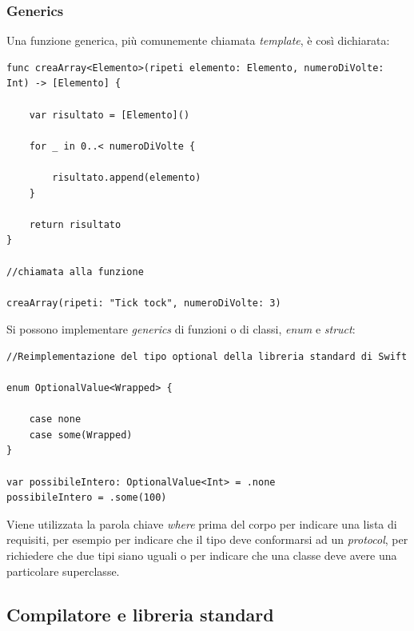 \subsubsection{Generics}
Una funzione generica, più comunemente chiamata \textit{template}, è così dichiarata:
\lstset{language=[Objective]C, breakindent=40pt, breaklines} 
\begin{lstlisting}
func creaArray<Elemento>(ripeti	elemento: Elemento, numeroDiVolte: Int) -> [Elemento] {

	var risultato = [Elemento]()
	
	for _ in 0..< numeroDiVolte {
		
		risultato.append(elemento)
	}
	
	return risultato
}

//chiamata alla funzione 

creaArray(ripeti: "Tick tock", numeroDiVolte: 3)
\end{lstlisting}
Si possono implementare \textit{generics} di funzioni o di classi, \textit{enum} e \textit{struct}:
\lstset{language=[Objective]C, breakindent=40pt, breaklines}
\begin{lstlisting}
//Reimplementazione del tipo optional della libreria standard di Swift

enum OptionalValue<Wrapped> {

	case none 
	case some(Wrapped)
}

var possibileIntero: OptionalValue<Int> = .none
possibileIntero = .some(100)
\end{lstlisting}
Viene utilizzata la parola chiave \textit{where} prima del corpo per indicare una lista di requisiti, per esempio per indicare che il tipo deve conformarsi ad un \textit{protocol}, per richiedere che due tipi siano uguali o per indicare che una classe deve avere una particolare superclasse.
\subsection{Compilatore e libreria standard}
